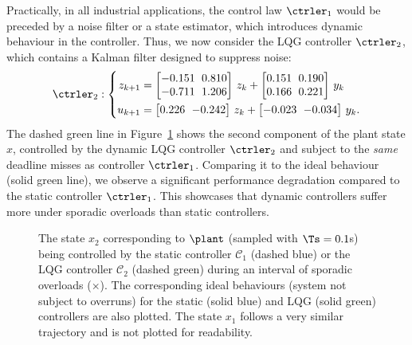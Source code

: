 \begin{example}
    Practically, in all industrial applications, the control law $\ctrler_1$ would be preceded by a noise filter or a state estimator, which introduces dynamic behaviour in the controller. 
    Thus, we now consider the LQG controller $\ctrler_2$, which contains a Kalman filter designed to suppress noise: 
    \begin{equation*}
        {\setlength\arraycolsep{3pt}
        \ctrler_2 : \left\{
        \begin{aligned}
            z_{k+1} &=
            \begin{bmatrix}
                -0.151 & 0.810 \\
                -0.711 & 1.206
            \end{bmatrix}\,z_k + 
            \begin{bmatrix}
                0.151 & 0.190 \\
                0.166 & 0.221
            \end{bmatrix}\,y_k \\
            u_{k+1} &=
            \begin{bmatrix}
                0.226 & -0.242
            \end{bmatrix}\,z_{k} +
            \begin{bmatrix}
                -0.023 & -0.034
            \end{bmatrix}\,y_k .
            \end{aligned}
        \right.}
    \end{equation*}
    The dashed green line in Figure~\ref{fig:lqr-lqg} shows the second component of the plant state $x$, controlled by the dynamic LQG controller $\ctrler_2$ and subject to the \emph{same} deadline misses as controller $\ctrler_1$.
    Comparing it to the ideal behaviour (solid green line), we observe a significant performance degradation compared to the static controller $\ctrler_1$.
    This showcases that dynamic controllers suffer more under sporadic overloads than static controllers.
\end{example}

\begin{figure}[t]
    \centerline{}
    \caption{The state $x_2$ corresponding to $\plant$ (sampled with $\Ts=0.1$s) being controlled by the static controller $\mathcal{C}_1$ (dashed blue) or the LQG controller $\mathcal{C}_2$ (dashed green) during an interval of sporadic overloads ($\times$).
        The corresponding ideal behaviours (system not subject to overruns) for the static (solid blue) and LQG (solid green) controllers are also plotted.
        The state $x_1$ follows a very similar trajectory and is not plotted for readability.}
    \label{fig:lqr-lqg}
\end{figure}

